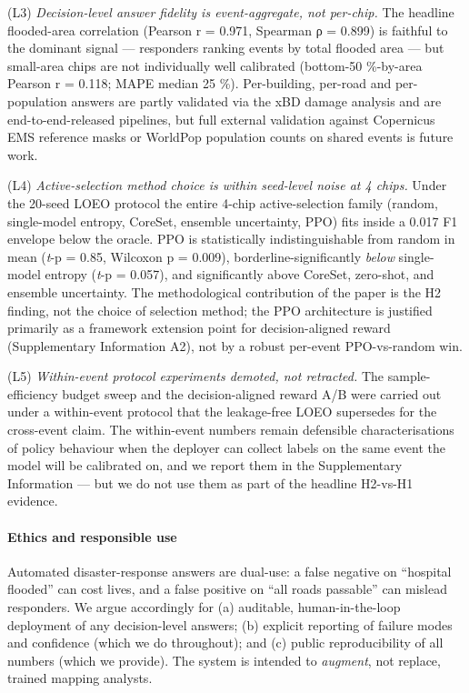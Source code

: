 (L3) \emph{Decision-level answer fidelity is event-aggregate, not per-chip.}
The headline flooded-area correlation (Pearson r = 0.971, Spearman ρ =
0.899) is faithful to the dominant signal --- responders ranking events
by total flooded area --- but small-area chips are not individually well
calibrated (bottom-50 \%-by-area Pearson r = 0.118; MAPE median 25 \%).
Per-building, per-road and per-population answers are partly validated
via the xBD damage analysis and are end-to-end-released pipelines, but
full external validation against Copernicus EMS reference masks or
WorldPop population counts on shared events is future work.

(L4) \emph{Active-selection method choice is within seed-level noise at
4 chips.} Under the 20-seed LOEO protocol the entire 4-chip
active-selection family (random, single-model entropy, CoreSet,
ensemble uncertainty, PPO) fits inside a 0.017 F1 envelope below the
oracle. PPO is statistically indistinguishable from random in mean
(\emph{t}-p = 0.85, Wilcoxon p = 0.009), borderline-significantly \emph{below}
single-model entropy (\emph{t}-p = 0.057), and significantly above CoreSet,
zero-shot, and ensemble uncertainty. The methodological contribution of
the paper is the H2 finding, not the choice of selection method; the
PPO architecture is justified primarily as a framework extension point
for decision-aligned reward (Supplementary Information A2), not by a
robust per-event PPO-vs-random win.

(L5) \emph{Within-event protocol experiments demoted, not retracted.} The
sample-efficiency budget sweep and the decision-aligned reward A/B
were carried out under a within-event protocol that the leakage-free
LOEO supersedes for the cross-event claim. The within-event numbers
remain defensible characterisations of policy behaviour when the
deployer can collect labels on the same event the model will be
calibrated on, and we report them in the Supplementary Information ---
but we do not use them as part of the headline H2-vs-H1 evidence.

\paragraph{Ethics and responsible use}\label{ethics-and-responsible-use}

Automated disaster-response answers are dual-use: a false negative on
``hospital flooded'' can cost lives, and a false positive on ``all roads
passable'' can mislead responders. We argue accordingly for (a) auditable,
human-in-the-loop deployment of any decision-level answers; (b) explicit
reporting of failure modes and confidence (which we do throughout); and
(c) public reproducibility of all numbers (which we provide). The system is
intended to \emph{augment}, not replace, trained mapping analysts.

